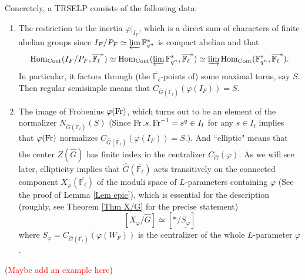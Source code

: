     Concretely, a TRSELP consists of the following data:
    
    \begin{enumerate}
    	\item The restriction to the inertia $\varphi|_{I_F}$, which is a direct sum of characters of finite abelian groups since $I_F/P_F \simeq \varprojlim\mathbb{F}_{q^n}^*$ is compact abelian and that
    	$$\operatorname{\operatorname{Hom}}_{\operatorname{Cont}}(I_F/P_F, \overline{\mathbb{F}_{\ell}}^*) \simeq \operatorname{\operatorname{Hom}}_{\operatorname{Cont}}(\varprojlim\mathbb{F}_{q^n}^*, \overline{\mathbb{F}_{\ell}}^*) \simeq \varinjlim\operatorname{\operatorname{Hom}}_{\operatorname{Cont}}(\mathbb{F}_{q^n}^*, \overline{\mathbb{F}_{\ell}}^*).$$
    	In particular, it factors through (the $\overline{\mathbb{F}_{\ell}}$-points of) some maximal torus, say $S$. Then regular semisimple means that $C_{\hat{G}(\overline{\mathbb{F}_{\ell}})}(\varphi(I_F))=S$.
    	\item The image of Frobenius $\varphi(\operatorname{Fr})$, which turns out to be an element of the normalizer $N_{\hat{G}(\overline{\mathbb{F}_{\ell}})}(S)$ (Since $\operatorname{Fr}.s.\operatorname{Fr}^{-1}=s^q \in I_t$ for any $s \in I_t$ implies that $\varphi(\operatorname{Fr})$ normalizes $C_{\hat{G}(\overline{\mathbb{F}_{\ell}})}(\varphi(I_F))=S$.). 
        And ``elliptic" means that the center $Z(\hat{G})$ has finite index in the centralizer $C_{\hat{G}}(\varphi)$. As we will see later, ellipticity implies that $\hat{G}(\overline{\mathbb{F}_{\ell}})$ acts transitively on the connected component $X_{\varphi}(\overline{\mathbb{F}_{\ell}})$ of the moduli space of $L$-parameters containing $\varphi$ (See the proof of Lemma \ref{Lem epic}), which is essential for the description (roughly, see Theorem \ref{Thm X/G} for the precise statement)
    	$$[X_{\varphi}/\hat{G}] \simeq [*/\underline{S_{\varphi}}]$$
    	where $S_\varphi=C_{\hat{G}(\overline{\mathbb{F}_{\ell}})}(\varphi(W_F))$ is the centralizer of the whole $L$-parameter $\varphi$.
    \end{enumerate}

    (\textcolor{red}{Maybe add an example here})

